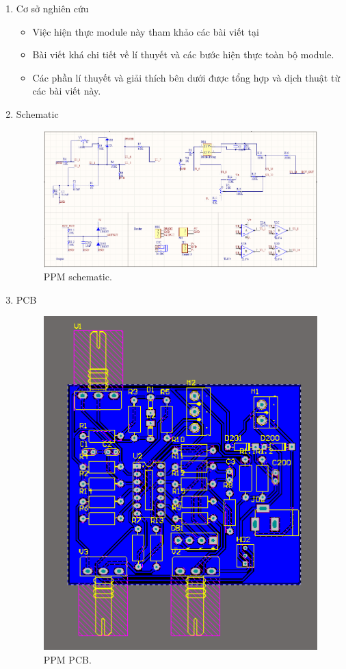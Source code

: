 \documentclass[a4paper,12pt,oneside]{article}
\begin{document}
\begin{enumerate}
\item Cơ sở nghiên cứu
	\begin{itemize}
	\item Việc hiện thực module này tham khảo các bài viết tại \cite{ppm}\cite{electrical}\cite{actodc}
	\item Bài viết khá chi tiết về lí thuyết và các bước hiện thực toàn bộ module.
	\item Các phần lí thuyết và giải thích bên dưới được tổng hợp và dịch thuật từ các bài viết này.
	\end{itemize}
	
\item Schematic

\begin{figure}[H]
\centering
\includegraphics[scale=.65]{hinh/PPM/schematic_ppm.PNG}
\caption{PPM schematic.}
\end{figure}

\item PCB

\begin{figure}[H]
\centering
\includegraphics[scale=.7]{hinh/PPM/pcb_ppm.PNG}
\caption{PPM PCB.}
\end{figure}


\end{enumerate}
\end{document}
